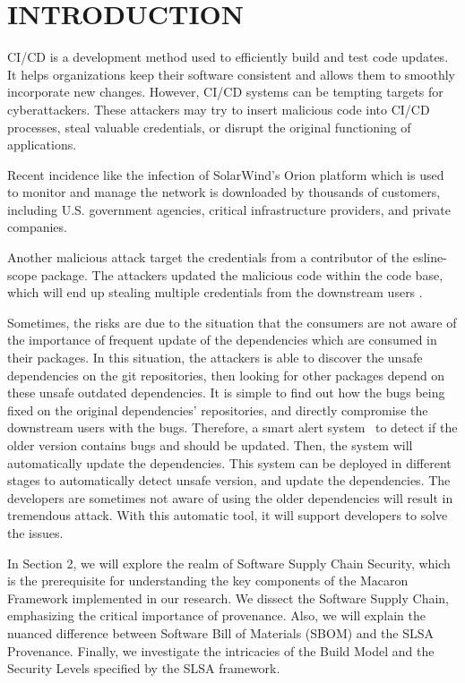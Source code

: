 \section{INTRODUCTION}
CI/CD is a development method used to efficiently build and test code updates. 
It helps organizations keep their software consistent and allows them to smoothly 
incorporate new changes. However, CI/CD systems can be tempting targets for cyberattackers. 
These attackers may try to insert malicious code into CI/CD processes, 
steal valuable credentials, or disrupt the original functioning of applications\cite{sonatype2020}.

Recent incidence like the infection of SolarWind's Orion platform \cite{ladisa2023sok, 
peisert2021perspectives} which is used to monitor and manage the network is downloaded by 
thousands of customers, including U.S. government agencies, critical infrastructure providers, 
and private companies. 

Another malicious attack target the credentials from a contributor of the esline-scope package.
The attackers updated the malicious code within the code base, which will end up stealing
multiple credentials from the downstream users \cite{eslint2018}.

Sometimes, the risks are due to the situation that the consumers are not aware of the importance 
of frequent update of the dependencies which are consumed in their packages. In this situation,
the attackers is able to discover the unsafe dependencies on the git repositories, then looking for
other packages depend on these unsafe outdated dependencies. It is simple to find out how the bugs being
fixed on the original dependencies' repositories, and directly compromise the downstream users with the bugs.
Therefore, a smart alert system~\cite{wang2020empirical} to detect if the older version contains
bugs and should be updated. Then, the system will automatically update the dependencies. This system can be deployed
in different stages to automatically detect unsafe version, and update the dependencies. The developers 
are sometimes not aware of using the older dependencies will result in tremendous attack. With this automatic tool,
it will support developers to solve the issues.

In Section 2, we will explore the realm of Software Supply Chain Security, which is the prerequisite
for understanding the key components of the Macaron Framework implemented in our research.
We dissect the Software Supply Chain, emphasizing the critical importance of provenance. 
Also, we will explain the nuanced difference between Software Bill of Materials (SBOM) and the SLSA Provenance.
Finally, we investigate the intricacies of the Build Model and the Security Levels specified by the SLSA framework.

